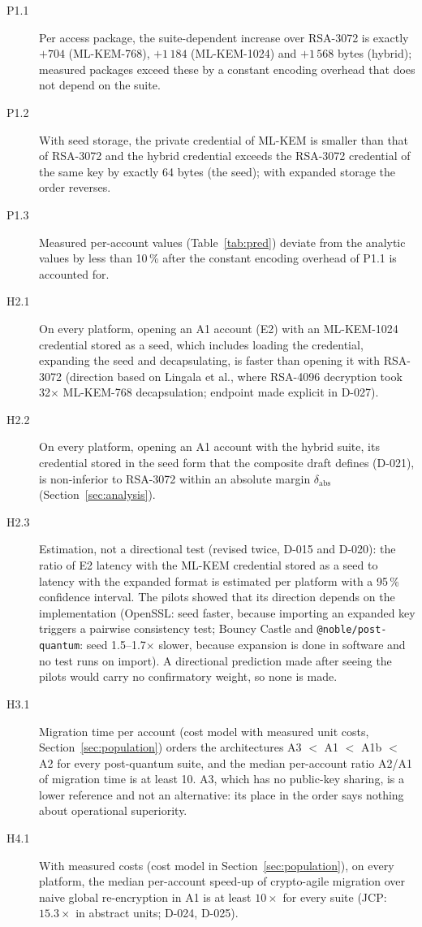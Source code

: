 \documentclass[11pt,a4paper]{article}
\begin{document}
\begin{description}
\item[P1.1] Per access package, the suite-dependent increase over RSA-3072 is exactly $+704$ (ML-KEM-768), $+1\,184$ (ML-KEM-1024) and $+1\,568$ bytes (hybrid); measured packages exceed these by a constant encoding overhead that does not depend on the suite.
\item[P1.2] With seed storage, the private credential of ML-KEM is smaller than that of RSA-3072 and the hybrid credential exceeds the RSA-3072 credential of the same key by exactly 64 bytes (the seed); with expanded storage the order reverses.
\item[P1.3] Measured per-account values (Table~\ref{tab:pred}) deviate from the analytic values by less than 10\,\% after the constant encoding overhead of P1.1 is accounted for.
\item[H2.1] On every platform, opening an A1 account (E2) with an ML-KEM-1024 credential stored as a seed, which includes loading the credential, expanding the seed and decapsulating, is faster than opening it with RSA-3072 (direction based on Lingala et al., where RSA-4096 decryption took 32$\times$ ML-KEM-768 decapsulation; endpoint made explicit in D-027).
\item[H2.2] On every platform, opening an A1 account with the hybrid suite, its credential stored in the seed form that the composite draft defines (D-021), is non-inferior to RSA-3072 within an absolute margin $\delta_{\mathrm{abs}}$ (Section~\ref{sec:analysis}).
\item[H2.3] Estimation, not a directional test (revised twice, D-015 and D-020): the ratio of E2 latency with the ML-KEM credential stored as a seed to latency with the expanded format is estimated per platform with a 95\,\% confidence interval. The pilots showed that its direction depends on the implementation (OpenSSL: seed faster, because importing an expanded key triggers a pairwise consistency test; Bouncy Castle and \texttt{@noble/\allowbreak{}post-quantum}: seed 1.5--1.7$\times$ slower, because expansion is done in software and no test runs on import). A directional prediction made after seeing the pilots would carry no confirmatory weight, so none is made.
\item[H3.1] Migration time per account (cost model with measured unit costs, Section~\ref{sec:population}) orders the architectures A3 $<$ A1 $<$ A1b $<$ A2 for every post-quantum suite, and the median per-account ratio A2/A1 of migration time is at least 10. A3, which has no public-key sharing, is a lower reference and not an alternative: its place in the order says nothing about operational superiority.
\item[H4.1] With measured costs (cost model in Section~\ref{sec:population}), on every platform, the median per-account speed-up of crypto-agile migration over naive global re-encryption in A1 is at least $10\times$ for every suite (JCP: $15.3\times$ in abstract units; D-024, D-025).
\end{description}
\end{document}
